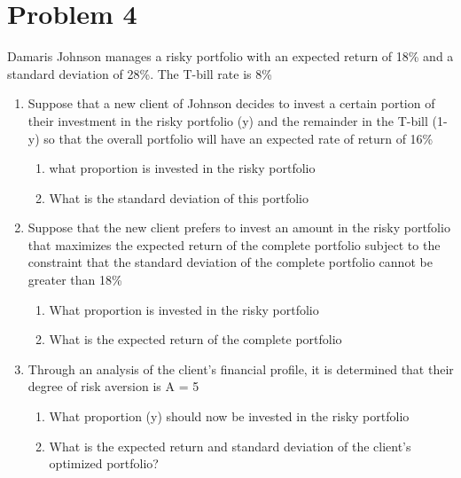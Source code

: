 \documentclass[10]{article}
\begin{document}
\section*{Problem 4}
Damaris Johnson manages a risky portfolio with an expected return of 18\% and a standard deviation of 28\%. The T-bill rate is 8\%
\begin{enumerate}
    \item[a)]  Suppose that a new client of Johnson decides to invest a certain portion of their investment in the risky portfolio (y) and the remainder in the T-bill (1-y)  so that the overall portfolio will have an expected rate of return of 16\%
    \begin{enumerate}
        \item[i.] what proportion is invested in the risky portfolio
        \item[ii.] What is the standard deviation of this portfolio
    \end{enumerate}
    \item[b)] Suppose that the new client prefers to invest an amount in the risky portfolio that maximizes the expected return of the complete portfolio subject to the constraint that the standard deviation of the complete portfolio cannot be greater than 18\%
    \begin{enumerate}
        \item[i.] What proportion is invested in the risky portfolio
        \item[ii.] What is the expected return of the complete portfolio
    \end{enumerate}
    \item[c)] Through an analysis of the client's financial profile, it is determined that their degree of risk aversion is A = 5
    \begin{enumerate}
        \item[i.] What proportion (y) should now be invested in the risky portfolio
        \item[ii.] What is the expected return and standard deviation of the client's optimized portfolio?
    \end{enumerate}
\end{enumerate}


\color{blue}
\end{document}
